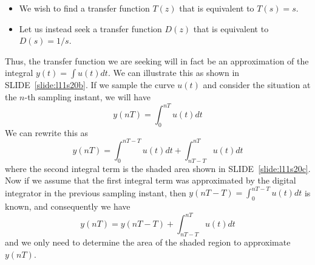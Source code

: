 \begin{slide}\label{slide:l11s20a}
  \begin{itemize}
  \item We wish to find a transfer function $T(z)$ that is equivalent to $T(s)=s$.
  \item Let us instead seek a transfer function $D(z)$ that is equivalent to $D(s) = 1/s$.
  \end{itemize}
\end{slide}

Thus, the transfer function we are seeking will in fact be an approximation of the integral $y(t)=\int u(t) dt$. We can illustrate this as shown in SLIDE~\ref{slide:l11s20b}. If we sample the curve $u(t)$ and consider the situation at the $n$-th sampling instant, we will have $$y(nT) = \int_{0}^{nT} u(t) dt$$ We can rewrite this as $$y(nT)= \int_{0}^{nT-T} u(t) dt + \int_{nT-T}^{nT} u(t) dt$$ where the second integral term is the shaded area shown in SLIDE~\ref{slide:l11s20c}. Now if we assume that the first integral term was approximated by the digital integrator in the previous sampling instant, then $y(nT-T) = \int_{0}^{nT-T} u(t) dt$ is known, and consequently we have $$y(nT) = y(nT-T) + \int_{nT-T}^{nT} u(t) dt$$ and we only need to determine the area of the shaded region to approximate $y(nT)$.

\begin{slide}\label{slide:l11s20b}
\begin{center}
\end{center}
\end{slide}

